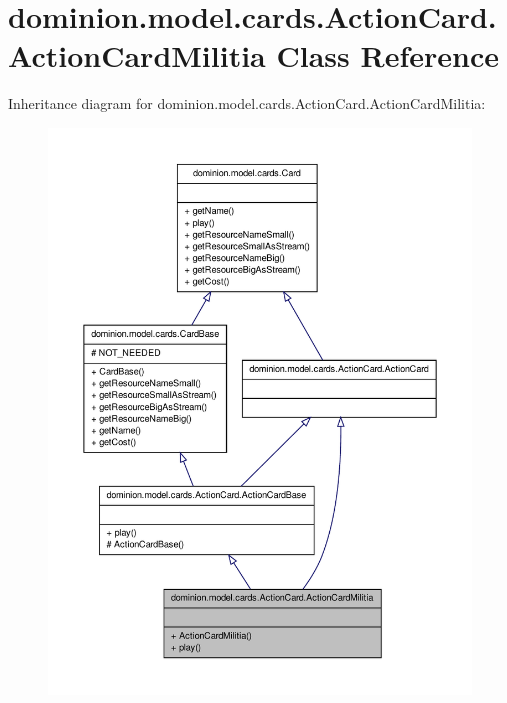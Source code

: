\hypertarget{classdominion_1_1model_1_1cards_1_1ActionCard_1_1ActionCardMilitia}{\section{dominion.\-model.\-cards.\-Action\-Card.\-Action\-Card\-Militia \-Class \-Reference}
\label{classdominion_1_1model_1_1cards_1_1ActionCard_1_1ActionCardMilitia}
}


\-Inheritance diagram for dominion.\-model.\-cards.\-Action\-Card.\-Action\-Card\-Militia\-:
\nopagebreak
\begin{figure}[H]
\begin{center}
\leavevmode
\includegraphics[width=350pt]{classdominion_1_1model_1_1cards_1_1ActionCard_1_1ActionCardMilitia__inherit__graph}
\end{center}
\end{figure}


